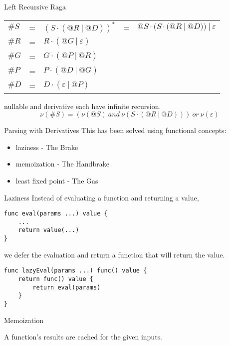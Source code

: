 \documentclass[10pt]{beamer}
\begin{document}
\begin{frame}{Left Recursive Raga}
\begin{center}
\begin{tabular}{lllll}
$\#S$ & {\color{gray}=} & {\color{gray} $(S \cdot ( @R\ |\ @D ))^{*}$} & = & $@S \cdot (S \cdot ( @R\ |\ @D ))\ |\ \varepsilon$ \\
$\#R$ & = & $R \cdot ( @G\ |\ \varepsilon )$ \\
$\#G$ & = & $G \cdot ( @P\ |\ @R )$ \\
$\#P$ & = & $P \cdot ( @D\ |\ @G )$ \\
$\#D$ & = & $D \cdot ( \varepsilon\ |\ @P )$ \\
\end{tabular}
\end{center}


nullable and derivative each have infinite recursion.
$$
\nu(\#S) = (\nu(@S)\ and\ \nu(S \cdot ( @R\ |\ @D )))\ or\  \nu(\varepsilon)
$$
\end{frame}

\begin{frame}{Parsing with Derivatives}
This has been solved using \cite{might2011parsing} functional concepts:
\begin{itemize}
\item laziness - The Brake
\item memoization - The Handbrake
\item least fixed point - The Gas
\end{itemize}
\end{frame}

\begin{frame}[fragile]{Laziness}
Instead of evaluating a function and returning a value, 
\begin{verbatim}
func eval(params ...) value {
    ...
    return value(...)
}
\end{verbatim}
we defer the evaluation and return a function that will return the value.
\begin{verbatim}
func lazyEval(params ...) func() value {
    return func() value {
        return eval(params)
    }
}
\end{verbatim}
\end{frame}

\begin{frame}{Memoization}
\begin{center}
A function's results are cached for the given inputs.
\end{center}
\end{frame}
\end{document}
